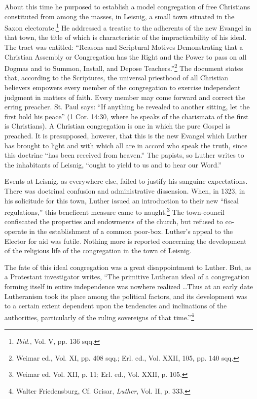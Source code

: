 About this time he purposed to establish a model congregation of free
Christians constituted from among the masses, in Leisnig, a small town situated
in the Saxon electorate.\footnote{\textit{Ibid.}, Vol. V, pp. 136 sqq.}
He addressed a treatise to the adherents of
the new Evangel in that town, the title of which is characteristic of the
impracticability of his ideal. The tract was entitled: “Reasons and Scriptural
Motives Demonstrating that a Christian Assembly or Congregation has the
Right and the Power to pass on all Dogmas and to Summon, Install, and
Depose Teachers.”\footnote{Weimar ed., Vol. XI, pp. 408 sqq.; Erl. ed., Vol. XXII, 105, pp. 140 sqq.}
The document states that, according to the Scriptures,
the universal priesthood of all Christian believers empowers every member
of the congregation to exercise independent judgment in matters of faith.
Every member may come forward and correct the erring preacher. St. Paul
says: “If anything be revealed to another sitting, let the first hold his
peace” (1 Cor. 14:30, where he speaks of the charismata of the first is
Christians). A Christian congregation is one in which the pure Gospel is
preached. It is presupposed, however, that this is the new Evangel which
Luther has brought to light and with which all are in accord who
speak the truth, since this doctrine ``has been received from heaven.''
The papists, so Luther writes to the inhabitants of Leisnig, ``ought to
yield to us and to hear our Word.''

Events at Leisnig, as everywhere else,
failed to justify his sanguine expectations. There was doctrinal confusion
and administrative dissension. When, in 1323, in his solicitude for this
town, Luther issued an introduction to their new ``fiscal regulations,''
this beneficent measure came to naught.\footnote{Weimar ed. Vol. XII, p. 11; Erl. ed., Vol. XXII, p. 105.}
The town-council confiscated the properties and endowments of the church,
but refused to co-operate in the establishment of a common poor-box.
Luther’s appeal to the Elector for aid was futile. Nothing more is reported
concerning the development of the religious life of the congregation in the
town of Leisnig.

The fate of this ideal congregation was a great disappointment to
Luther. But, as a Protestant investigator writes, “The primitive
Lutheran ideal of a congregation forming itself in entire independence
was nowhere realized \dots Thus at an early date Lutheranism took
its place among the political factors, and its development was to a
certain extent dependent upon the tendencies and inclinations of the
authorities, particularly of the ruling sovereigns of that time.”\footnote
{Walter Friedensburg, Cf. Grisar, \textit{Luther}, Vol. II, p. 333.}
